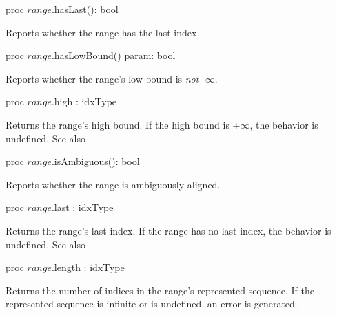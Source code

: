 \begin{protohead}
proc $range$.hasLast(): bool
\end{protohead}
\begin{protobody}
Reports whether the range has the last index.
\end{protobody}

\begin{protohead}
proc $range$.hasLowBound() param: bool
\end{protohead}
\begin{protobody}
Reports whether the range's low bound is \emph{not} -$\infty$.
\end{protobody}

\begin{protohead}
proc $range$.high : idxType
\end{protohead}
\begin{protobody}
Returns the range's high bound.
If the high bound is +$\infty$, the behavior is undefined.
See also .
\end{protobody}


\begin{protohead}
proc $range$.isAmbiguous(): bool
\end{protohead}
\begin{protobody}
Reports whether the range is ambiguously aligned.
\end{protobody}

\begin{protohead}
proc $range$.last : idxType
\end{protohead}
\begin{protobody}
Returns the range's last index.
If the range has no last index, the behavior is undefined.
See also .
\end{protobody}

\begin{protohead}
proc $range$.length : idxType
\end{protohead}
\begin{protobody}
Returns the number of indices in the range's represented sequence.
If the represented sequence is infinite or is undefined,
an error is generated.
\end{protobody}

